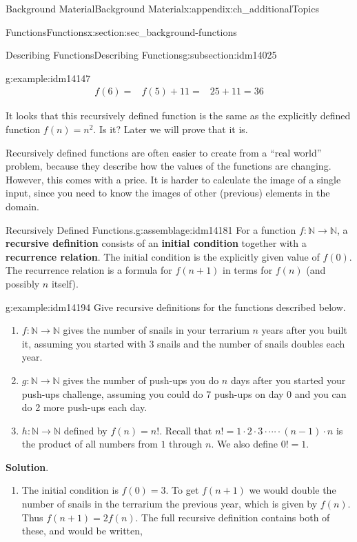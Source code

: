 \documentclass[oneside,10pt,]{book}
\newcommand{\terminology}[1]{\textbf{#1}}
\numberwithin{equation}{chapter}
\def\N{\mathbb N}
\newcommand{\amp}{&}
\begin{document}
\begin{appendixptx}{Background Material}{}{Background Material}{}{}{x:appendix:ch_additionalTopics}
\begin{sectionptx}{Functions}{}{Functions}{}{}{x:section:sec_background-functions}
\begin{subsectionptx}{Describing Functions}{}{Describing Functions}{}{}{g:subsection:idm14025}
\begin{example}{}{g:example:idm14147}
\begin{align*}
f(6) = \amp f(5) + 11 = \amp 25 + 11 = 36
\end{align*}
%
\par
It looks that this recursively defined function is the same as the explicitly defined function \(f(n) = n^2\).  Is it?  Later we will prove that it is.%
\end{example}
Recursively defined functions are often easier to create from a ``real world'' problem, because they describe how the values of the functions are changing.  However, this comes with a price. It is harder to calculate the image of a single input, since you need to know the images of other (previous) elements in the domain.%
\begin{assemblage}{Recursively Defined Functions.}{g:assemblage:idm14181}%
For a function \(f:\N \to \N\), a \terminology{recursive definition} consists of an \terminology{initial condition} together with a \terminology{recurrence relation}.  The initial condition is the explicitly given value of \(f(0)\). The recurrence relation is a formula for \(f(n+1)\) in terms for \(f(n)\) (and possibly \(n\) itself).%
\end{assemblage}
\begin{example}{}{g:example:idm14194}%
Give recursive definitions for the functions described below.%
\begin{enumerate}
\item{}\(f:\N \to \N\) gives the number of snails in your terrarium \(n\) years after you built it, assuming you started with 3 snails and the number of snails doubles each year.%
\item{}\(g:\N \to \N\) gives the number of push-ups you do \(n\) days after you started your push-ups challenge, assuming you could do 7 push-ups on day 0 and you can do 2 more push-ups each day.%
\item{}\(h:\N \to \N\) defined by \(f(n) = n!\).  Recall that \(n! = 1 \cdot 2 \cdot 3 \cdot \cdots \cdot (n-1)\cdot n\) is the product of all numbers from \(1\) through \(n\).  We also define \(0! = 1\).%
\end{enumerate}
%
\par\smallskip%
\noindent\textbf{Solution}.\hypertarget{g:solution:idm14214}{}\quad{}%
\begin{enumerate}
\item{}The initial condition is \(f(0) = 3\).  To get \(f(n+1)\) we would double the number of snails in the terrarium the previous year, which is given by \(f(n)\).  Thus \(f(n+1) = 2f(n)\).  The full recursive definition contains both of these, and would be written,%

\end{enumerate}
\end{example}
\end{subsectionptx}
\end{sectionptx}
\end{appendixptx}
\end{document}
